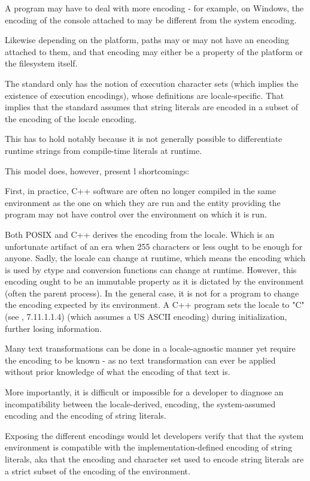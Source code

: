 \documentclass{wg21}
\begin{document}
\note A program may have to deal with more encoding - for example, on Windows, the encoding of the console attached to  may be different from the system encoding.

Likewise depending on the platform, paths may or may not have an encoding attached to them, and that encoding may either be a property of the platform or the filesystem itself.
\endnote


The standard only has the notion of execution character sets (which implies the existence of execution encodings), whose definitions are locale-specific.
That implies that the standard assumes that string literals are encoded in a subset of the encoding of the locale encoding.

This has to hold notably because it is not generally possible to differentiate runtime strings from compile-time literals at runtime.

This model does, however, present l shortcomings:

First, in practice, C++ software are often no longer compiled in the same environment as the one on which they are run and the entity providing the program may not have control over the environment on which it is run.

Both POSIX and C++ derives the encoding from the locale. Which is an unfortunate artifact of an era when 255 characters or less ought to be enough for anyone.
Sadly, the locale can change at runtime, which means the encoding which is used by ctype and conversion functions can change at runtime.
However, this encoding ought to be an immutable property as it is dictated by the environment (often the parent process).
In the general case, it is not for a program to change the encoding expected by its environment.
A C++ program sets the locale to "C" (see \cite{N2346}, 7.11.1.1.4) (which assumes a US ASCII encoding) during initialization, further losing information.


Many text transformations can be done in a locale-agnostic manner yet require the encoding to be known - as no text transformation can ever be applied without
prior knowledge of what the encoding of that text is.

More importantly, it is difficult or impossible for a developer to diagnose an incompatibility between the locale-derived, encoding, the system-assumed encoding and
the encoding of string literals.

Exposing the different encodings would let developers verify that that the system environment is compatible with the implementation-defined encoding of string literals, aka that the encoding and character set used to encode string literals are a strict subset of the encoding of the environment.
\end{document}
